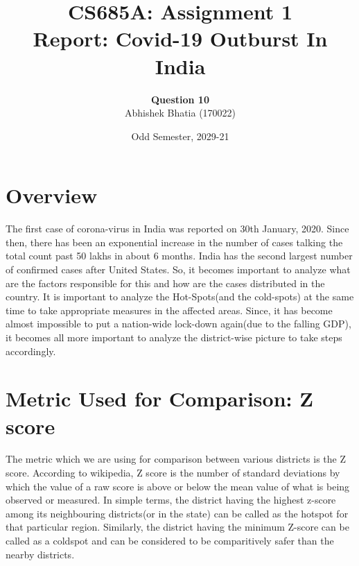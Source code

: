 \documentclass[11pt]{article}
\title{CS685A: Assignment 1\\Report: Covid-19 Outburst In India}
\author{\textbf{Question 10}\\
Abhishek Bhatia (170022)}
\date{Odd Semester, 2029-21}
\begin{document}
\maketitle

\section{Overview}

\noindent The first case of corona-virus in India was reported on 30th January, 2020. Since then, there has been an exponential increase in the number of cases talking the total count past 50 lakhs in about 6 months. India has the second largest number of confirmed cases after United States. So, it becomes important to analyze what are the factors responsible for this and how are the cases distributed in the country. It is important to analyze the Hot-Spots(and the cold-spots) at the same time to take appropriate measures in the affected areas. Since, it has become almost impossible to put a nation-wide lock-down again(due to the falling GDP), it becomes all more important to analyze the district-wise picture to take steps accordingly.

\section{Metric Used for Comparison: Z score}
The metric which we are using for comparison between various districts is the Z score. According to wikipedia, Z score is the number of standard deviations by which the value of a raw score is above or below the mean value of what is being observed or measured. In simple terms, the district having the highest z-score among its neighbouring districts(or in the state) can be called as the hotspot for that particular region. Similarly, the district having the minimum Z-score can be called as a coldspot and can be considered to be comparitively safer than the nearby districts.
\end{document}
